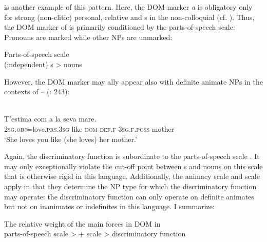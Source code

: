 \documentclass[output=paper]{langsci/langscibook}
\begin{document}
 is another example of this pattern. Here, the DOM marker \textit{a} is obligatory only for strong (non-clitic) personal, relative and  s in the non-colloquial  (cf. \citealt{Escandell-Vidal2009}). Thus, the DOM marker of  is primarily conditioned by the parts-of-speech scale: Pronouns are marked while other NPs are unmarked: 

\ea\label{ex:serzant:13}
Parts-of-speech scale\\
(independent) s > nouns\\
\z

\noindent However, the DOM marker may ally appear also with definite animate NPs in the contexts of –  (\citealt{WheelerEtAl1999}: 243):

\ea\label{ex:serzant:14}
\\
\gll T’estima     com a     la   seva     mare.\\
     \textsc{2sg.obj}=love.\textsc{prs.3sg} like \textsc{dom}   \textsc{def.f}   \textsc{3sg.f.poss}   mother\\
\glt ‘She loves you like (she loves) her mother.’
\z

\noindent Again, the discriminatory function is subordinate to the parts-of-speech scale . It may only exceptionally violate the cut-off point between s and nouns on this scale that is otherwise rigid in this language. Additionally, the animacy scale  and  scale  apply in that they determine the NP type for which the discriminatory function may operate: the discriminatory function can only operate on definite animates but not on inanimates or indefinites in this language. I summarize:

\ea\label{ex:serzant:15}
The relative weight of the main forces in DOM in \\
parts-of-speech scale >  +  scale > discriminatory function
\z
\end{document}
